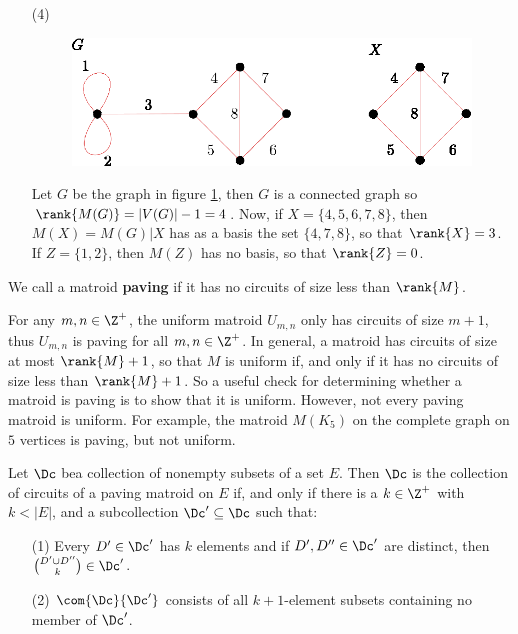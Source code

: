 \begin{example}
\begin{enumerate}
    \item[(4)]
         \begin{figure}[h]
            \centering
            \includegraphics[scale=1.0]{Figures/Chapter1/connected_graph_rank.eps}
            \caption{}
            \label{fig_1.4}
        \end{figure}
        Let $G$ be the graph in figure \ref{fig_1.4}, then $G$ is a connected
        graph so  $\rank{M(G)}=|V(G)|-1=4$. Now, if $X=\{4,5,6,7,8\}$, then
        $M(X)=M(G)|X$ has as a basis the set $\{4,7,8\}$, so that $\rank{X}=3$.
        If $Z=\{1,2\}$, then $M(Z)$ has no basis, so that $\rank{Z}=0$.
    \end{enumerate}
\end{example}

\begin{definition}
    We call a matroid \textbf{paving} if it has no circuits of size less than
    $\rank{M}$.
\end{definition}

\begin{example}\label{1.13}
    For any $m,n \in \Z^+$, the uniform matroid  $U_{m,n}$ only has circuits of
    size $m+1$, thus  $U_{m,n}$ is paving for all $m,n \in \Z^+$. In general, a
    matroid has circuits of size at most  $\rank{M}+1$, so that $M$ is uniform
    if, and only if it has no circuits of size less than $\rank{M}+1$. So a
    useful check for determining whether a matroid is paving is to show that it
    is uniform. However, not every paving matroid is uniform. For example, the
    matroid $M(K_5)$ on the complete graph on $5$ vertices is paving, but not
    uniform.
\end{example}

\begin{theorem}\label{1.3.5}
    Let $\Dc$ bea collection of nonempty subsets of a set $E$. Then  $\Dc$ is
    the collection of circuits of a paving matroid on  $E$ if, and only if there
    is a  $k \in \Z^+$ with  $k<|E|$, and a subcollection  $\Dc' \subseteq \Dc$
    such that:
    \begin{enumerate}
        \item[(1)] Every $D' \in \Dc'$ has  $k$ elements and if  $D',D'' \in
            \Dc'$ are distinct, then ${D' \cup D'' \choose k} \in \Dc'$.

        \item[(2)] $\com{\Dc}{\Dc'}$ consists of all $k+1$-element subsets
            containing no member of  $\Dc'$.
    \end{enumerate}
\end{theorem}

